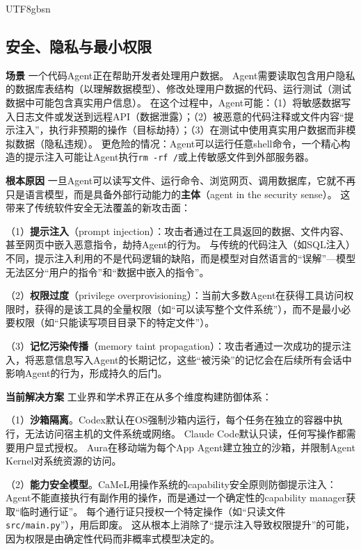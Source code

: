 \documentclass[11pt,a4paper]{article}
\begin{document}
\begin{CJK*}{UTF8}{gbsn}
\subsection{安全、隐私与最小权限}

\textbf{场景}
一个代码Agent正在帮助开发者处理用户数据。
Agent需要读取包含用户隐私的数据库表结构（以理解数据模型）、修改处理用户数据的代码、运行测试（测试数据中可能包含真实用户信息）。
在这个过程中，Agent可能：（1）将敏感数据写入日志文件或发送到远程API（数据泄露）；（2）被恶意的代码注释或文件内容``提示注入''，执行非预期的操作（目标劫持）；（3）在测试中使用真实用户数据而非模拟数据（隐私违规）。
更危险的情况：Agent可以运行任意shell命令，一个精心构造的提示注入可能让Agent执行\texttt{rm -rf /}或上传敏感文件到外部服务器。

\textbf{根本原因}
一旦Agent可以读写文件、运行命令、浏览网页、调用数据库，它就不再只是语言模型，而是具备外部行动能力的\textbf{主体}（agent in the security sense）。
这带来了传统软件安全无法覆盖的新攻击面：

（1）\textbf{提示注入}（prompt injection）：攻击者通过在工具返回的数据、文件内容、甚至网页中嵌入恶意指令，劫持Agent的行为。
与传统的代码注入（如SQL注入）不同，提示注入利用的不是代码逻辑的缺陷，而是模型对自然语言的``误解''---模型无法区分``用户的指令''和``数据中嵌入的指令''\cite{debenedetti2025camel,owasp_agentic2026}。

（2）\textbf{权限过度}（privilege overprovisioning）：当前大多数Agent在获得工具访问权限时，获得的是该工具的全量权限（如``可以读写整个文件系统''），而不是最小必要权限（如``只能读写项目目录下的特定文件''）。

（3）\textbf{记忆污染传播}（memory taint propagation）：攻击者通过一次成功的提示注入，将恶意信息写入Agent的长期记忆，这些``被污染''的记忆会在后续所有会话中影响Agent的行为，形成持久的后门\cite{aura2025}。

\textbf{当前解决方案}
工业界和学术界正在从多个维度构建防御体系：

（1）\textbf{沙箱隔离}。Codex默认在OS强制沙箱内运行，每个任务在独立的容器中执行，无法访问宿主机的文件系统或网络\cite{openai_codex_sandbox_2026}。
Claude Code默认只读，任何写操作都需要用户显式授权\cite{anthropic_claudecode_security_2026}。
Aura在移动端为每个App Agent建立独立的沙箱，并限制Agent Kernel对系统资源的访问\cite{aura2025}。

（2）\textbf{能力安全模型}。CaMeL\cite{debenedetti2025camel}用操作系统的capability安全原则防御提示注入：Agent不能直接执行有副作用的操作，而是通过一个确定性的capability manager获取``临时通行证''。
每个通行证只授权一个特定操作（如``只读文件\texttt{src/main.py}''），用后即废。
这从根本上消除了``提示注入导致权限提升''的可能，因为权限是由确定性代码而非概率式模型决定的。


\end{CJK*}
\end{document}
